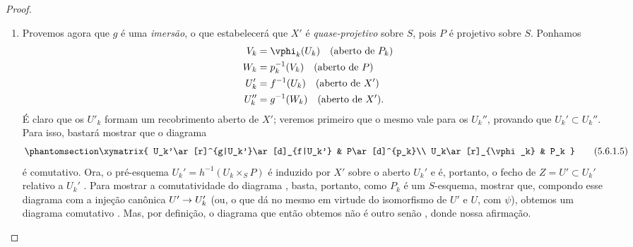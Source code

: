 \documentclass[oneside,10pt]{amsart}
\makeatletter
\newcommand{\ega@arrow}[2]{\mathchoice{#1}{#2}{#2}{#2}}
\renewcommand{\to}{\ega@arrow{\longrightarrow}{\rightarrow}}
\let\EGAOriginalLabel\label
\renewcommand{\label}[1]{\phantomsection\EGAOriginalLabel{#1}}
\makeatother
\begin{document}
\begin{proof}
\begin{enumerate}
  \item[(D)] Provemos agora que $g$ é uma \emph{imersão}, o que estabelecerá que $X'$ é \emph{quase-projetivo} sobre $S$, pois $P$ é projetivo sobre $S$.
    Ponhamos
    \begin{align*}
      V_k  &=\vphi_k(U_k) \quad(\text{aberto de }P_k)\\
      W_k  &=p_k^{-1}(V_k)\quad(\text{aberto de }P)\\
      U_k' &=f^{-1}(U_k)  \quad(\text{aberto de }X')\\
      U_k''&=g^{-1}(W_k)  \quad(\text{aberto de }X').
    \end{align*}
    É claro que os $U'_k$ formam um recobrimento aberto de $X'$; veremos primeiro que o mesmo vale para os $U_k''$, provando que $U_k'\subset U_k''$.
    Para isso, bastará mostrar que o diagrama
    \[
    \label{II.5.6.1.5}
      \xymatrix{
        U_k'\ar[r]^{g|U_k'}\ar[d]_{f|U_k'} &
        P\ar[d]^{p_k}\\
        U_k\ar[r]_{\vphi_k} &
        P_k
      }
      \tag{5.6.1.5}
    \]
    é comutativo.
    Ora, o pré-esquema $U_k'=h^{-1}(U_k\times_S P)$ é induzido por $X'$ sobre o aberto $U_k'$ e é, portanto, o fecho de $Z=U'\subset U_k'$ relativo a $U_k'$ .
    Para mostrar a comutatividade do diagrama , basta, portanto, como $P_k$ é um $S$-esquema, mostrar que, compondo esse diagrama com a injeção canônica $U'\to U_k'$ (ou, o que dá no mesmo em virtude do isomorfismo de $U'$ e $U$, com $\psi$), obtemos um diagrama comutativo .
    Mas, por definição, o diagrama que então obtemos não é outro senão , donde nossa afirmação.


\end{enumerate}
\end{proof}
\end{document}
